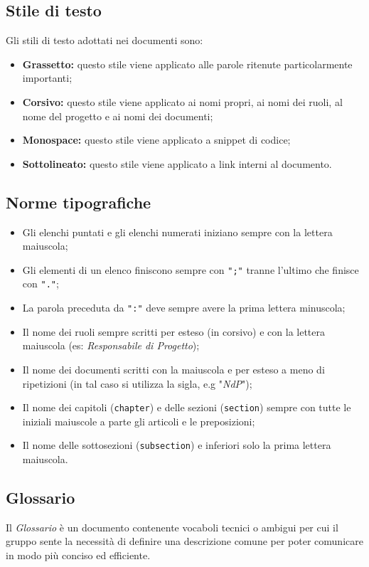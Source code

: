 \subsection{Stile di testo}
Gli stili di testo adottati nei documenti sono:
\begin{itemize}
    \item \textbf{Grassetto:} questo stile viene applicato alle parole ritenute particolarmente importanti;
    \item \textbf{Corsivo:} questo stile viene applicato ai nomi propri, ai nomi dei ruoli, al nome del progetto e ai nomi dei documenti;
    \item \textbf{Monospace:} questo stile viene applicato a snippet di codice;
    \item \textbf{Sottolineato:} questo stile viene applicato a link interni al documento.
\end{itemize}
\subsection{Norme tipografiche}
\begin{itemize}
    \item Gli elenchi puntati e gli elenchi numerati iniziano sempre con la lettera maiuscola;
    \item Gli elementi di un elenco finiscono sempre con \texttt{";"} tranne l'ultimo che finisce con \texttt{"."};
    \item La parola preceduta da \texttt{":"} deve sempre avere la prima lettera minuscola;
    \item Il nome dei ruoli sempre scritti per esteso (in corsivo) e con la lettera maiuscola (es: \textit{Responsabile di Progetto});
    \item Il nome dei documenti scritti con la maiuscola e per esteso a meno di ripetizioni (in tal caso si utilizza la sigla, e.g "\textit{NdP}");
    \item Il nome dei capitoli (\texttt{chapter}) e delle sezioni (\texttt{section}) sempre con tutte le iniziali maiuscole a parte gli articoli e le preposizioni;
    \item Il nome delle sottosezioni (\texttt{subsection}) e inferiori solo la prima lettera maiuscola.
\end{itemize}
\subsection{Glossario}
Il \textit{Glossario} è un documento contenente vocaboli tecnici o ambigui per cui il gruppo sente la necessità di definire una descrizione comune per poter comunicare in modo più conciso ed efficiente.

